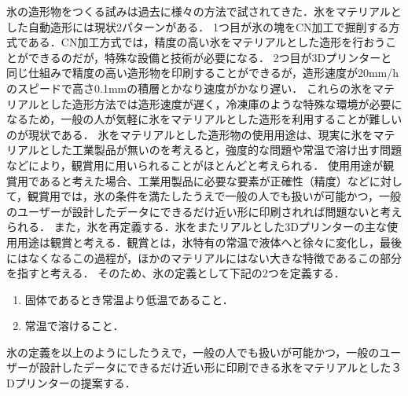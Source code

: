 氷の造形物をつくる試みは過去に様々の方法で試されてきた．氷をマテリアルとした自動造形には現状2パターンがある．
1つ目が氷の塊をCN加工で掘削する方式である．CN加工方式では，精度の高い氷をマテリアルとした造形を行おうことができるのだが，特殊な設備と技術が必要になる．
2つ目が3Dプリンターと同じ仕組みで精度の高い造形物を印刷することができるが，造形速度が20mm/hのスピードで高さ0.1mmの積層とかなり速度がかなり遅い．
これらの氷をマテリアルとした造形方法では造形速度が遅く，冷凍庫のような特殊な環境が必要になるため，一般の人が気軽に氷をマテリアルとした造形を利用することが難しいのが現状である．
氷をマテリアルとした造形物の使用用途は、現実に氷をマテリアルとした工業製品が無いのを考えると，強度的な問題や常温で溶け出す問題などにより，観賞用に用いられることがほとんどと考えられる．
使用用途が観賞用であると考えた場合、工業用製品に必要な要素が正確性（精度）などに対して，観賞用では，氷の条件を満たしたうえで一般の人でも扱いが可能かつ，一般のユーザーが設計したデータにできるだけ近い形に印刷されれば問題ないと考えられる．
また，氷を再定義する．氷をまたリアルとした3Dプリンターの主な使用用途は観賞と考える．観賞とは，氷特有の常温で液体へと徐々に変化し，最後にはなくなるこの過程が，ほかのマテリアルにはない大きな特徴であるこの部分を指すと考える．
そのため、氷の定義として下記の2つを定義する．

\begin{enumerate}
  \item 固体であるとき常温より低温であること． 
  \item 常温で溶けること．
 \end{enumerate}

氷の定義を以上のようにしたうえで，一般の人でも扱いが可能かつ，一般のユーザーが設計したデータにできるだけ近い形に印刷できる氷をマテリアルとした３Dプリンターの提案する．




